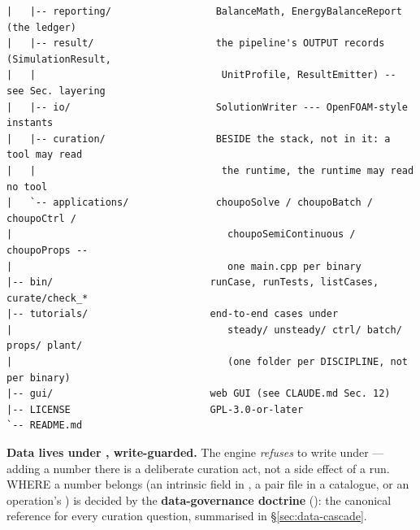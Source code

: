 \documentclass[11pt,a4paper]{article}
\begin{document}
\begin{lstlisting}
|   |-- reporting/                  BalanceMath, EnergyBalanceReport (the ledger)
|   |-- result/                     the pipeline's OUTPUT records (SimulationResult,
|   |                                UnitProfile, ResultEmitter) -- see Sec. layering
|   |-- io/                         SolutionWriter --- OpenFOAM-style instants
|   |-- curation/                   BESIDE the stack, not in it: a tool may read
|   |                                the runtime, the runtime may read no tool
|   `-- applications/               choupoSolve / choupoBatch / choupoCtrl /
|                                     choupoSemiContinuous / choupoProps --
|                                     one main.cpp per binary
|-- bin/                           runCase, runTests, listCases, curate/check_*
|-- tutorials/                     end-to-end cases under
|                                     steady/ unsteady/ ctrl/ batch/ props/ plant/
|                                     (one folder per DISCIPLINE, not per binary)
|-- gui/                           web GUI (see CLAUDE.md Sec. 12)
|-- LICENSE                        GPL-3.0-or-later
`-- README.md
\end{lstlisting}

\begin{keyidea}
\textbf{Data lives under , write-guarded.}  The engine
\emph{refuses} to write under  --- adding a number there
is a deliberate curation act, not a side effect of a run.  WHERE a number
belongs (an intrinsic field in , a pair file in a
catalogue, or an operation's ) is decided by the
\textbf{data-governance doctrine} (): the
canonical reference for every curation question, summarised in
\S\ref{sec:data-cascade}.
\end{keyidea}
\end{document}
